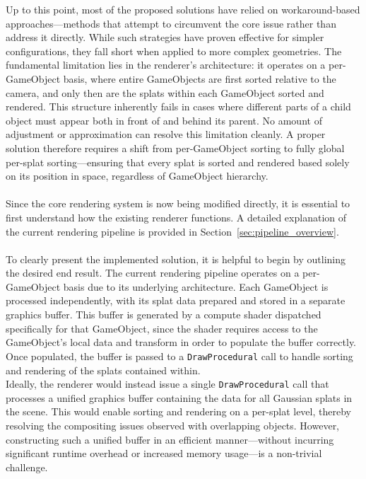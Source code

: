 \documentclass[12pt]{article}
\begin{document}
Up to this point, most of the proposed solutions have relied on workaround-based approaches—methods that attempt to circumvent the core issue rather than address it directly. While such strategies have proven effective for simpler configurations, they fall short when applied to more complex geometries. The fundamental limitation lies in the renderer’s architecture: it operates on a per-GameObject basis, where entire GameObjects are first sorted relative to the camera, and only then are the splats within each GameObject sorted and rendered. This structure inherently fails in cases where different parts of a child object must appear both in front of and behind its parent. No amount of adjustment or approximation can resolve this limitation cleanly. A proper solution therefore requires a shift from per-GameObject sorting to fully global per-splat sorting—ensuring that every splat is sorted and rendered based solely on its position in space, regardless of GameObject hierarchy.\\\\
Since the core rendering system is now being modified directly, it is essential to first understand how the existing renderer functions. A detailed explanation of the current rendering pipeline is provided in Section~\ref{sec:pipeline_overview}.
\\\\
To clearly present the implemented solution, it is helpful to begin by outlining the desired end result. The current rendering pipeline operates on a per-GameObject basis due to its underlying architecture. Each GameObject is processed independently, with its splat data prepared and stored in a separate graphics buffer. This buffer is generated by a compute shader dispatched specifically for that GameObject, since the shader requires access to the GameObject's local data and transform in order to populate the buffer correctly. Once populated, the buffer is passed to a \texttt{DrawProcedural} call to handle sorting and rendering of the splats contained within.\\
Ideally, the renderer would instead issue a single \texttt{DrawProcedural} call that processes a unified graphics buffer containing the data for all Gaussian splats in the scene. This would enable sorting and rendering on a per-splat level, thereby resolving the compositing issues observed with overlapping objects. However, constructing such a unified buffer in an efficient manner—without incurring significant runtime overhead or increased memory usage—is a non-trivial challenge.
\\\\
\end{document}
